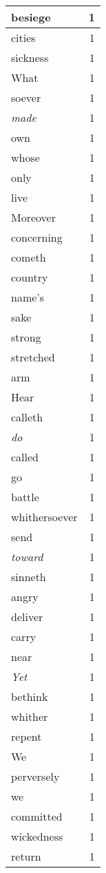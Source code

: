 \begin{center}
\begin{longtable}{l|r}
besiege & 1 \\ \hline
cities & 1 \\ \hline
sickness & 1 \\ \hline
What & 1 \\ \hline
soever & 1 \\ \hline
\emph{made} & 1 \\ \hline
own & 1 \\ \hline
whose & 1 \\ \hline
only & 1 \\ \hline
live & 1 \\ \hline
Moreover & 1 \\ \hline
concerning & 1 \\ \hline
cometh & 1 \\ \hline
country & 1 \\ \hline
name's & 1 \\ \hline
sake & 1 \\ \hline
strong & 1 \\ \hline
stretched & 1 \\ \hline
arm & 1 \\ \hline
Hear & 1 \\ \hline
calleth & 1 \\ \hline
\emph{do} & 1 \\ \hline
called & 1 \\ \hline
go & 1 \\ \hline
battle & 1 \\ \hline
whithersoever & 1 \\ \hline
send & 1 \\ \hline
\emph{toward} & 1 \\ \hline
sinneth & 1 \\ \hline
angry & 1 \\ \hline
deliver & 1 \\ \hline
carry & 1 \\ \hline
near & 1 \\ \hline
\emph{Yet} & 1 \\ \hline
bethink & 1 \\ \hline
whither & 1 \\ \hline
repent & 1 \\ \hline
We & 1 \\ \hline
perversely & 1 \\ \hline
we & 1 \\ \hline
committed & 1 \\ \hline
wickedness & 1 \\ \hline
return & 1 \\ \hline

\end{longtable}
\end{center}
